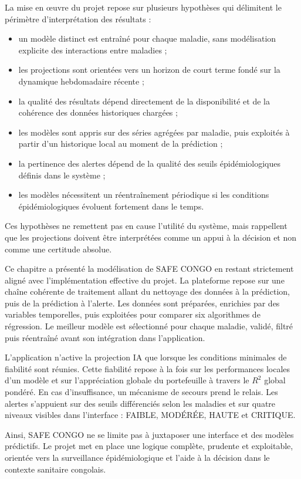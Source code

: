 La mise en \oe{}uvre du projet repose sur plusieurs hypothèses qui délimitent le périmètre d'interprétation des résultats :

\begin{itemize}
  \item un modèle distinct est entraîné pour chaque maladie, sans modélisation explicite des interactions entre maladies ;
  \item les projections sont orientées vers un horizon de court terme fondé sur la dynamique hebdomadaire récente ;
  \item la qualité des résultats dépend directement de la disponibilité et de la cohérence des données historiques chargées ;
  \item les modèles sont appris sur des séries agrégées par maladie, puis exploités à partir d'un historique local au moment de la prédiction ;
  \item la pertinence des alertes dépend de la qualité des seuils épidémiologiques définis dans le système ;
  \item les modèles nécessitent un réentraînement périodique si les conditions épidémiologiques évoluent fortement dans le temps.
\end{itemize}

Ces hypothèses ne remettent pas en cause l'utilité du système, mais rappellent que les projections doivent être interprétées comme un appui à la décision et non comme une certitude absolue.

\bigskip

Ce chapitre a présenté la modélisation de SAFE CONGO en restant strictement aligné avec l'implémentation effective du projet. La plateforme repose sur une chaîne cohérente de traitement allant du nettoyage des données à la prédiction, puis de la prédiction à l'alerte. Les données sont préparées, enrichies par des variables temporelles, puis exploitées pour comparer six algorithmes de régression. Le meilleur modèle est sélectionné pour chaque maladie, validé, filtré puis réentraîné avant son intégration dans l'application.

L'application n'active la projection IA que lorsque les conditions minimales de fiabilité sont réunies. Cette fiabilité repose à la fois sur les performances locales d'un modèle et sur l'appréciation globale du portefeuille à travers le $R^{2}$ global pondéré. En cas d'insuffisance, un mécanisme de secours prend le relais. Les alertes s'appuient sur des seuils différenciés selon les maladies et sur quatre niveaux visibles dans l'interface : FAIBLE, MODÉRÉE, HAUTE et CRITIQUE.

Ainsi, SAFE CONGO ne se limite pas à juxtaposer une interface et des modèles prédictifs. Le projet met en place une logique complète, prudente et exploitable, orientée vers la surveillance épidémiologique et l'aide à la décision dans le contexte sanitaire congolais.

